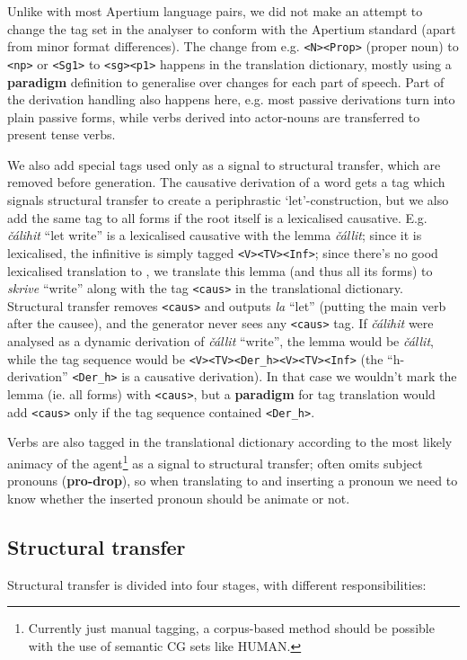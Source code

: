 \documentclass{book}
\begin{document}
Unlike with most Apertium language pairs, we did not make an attempt
to change the tag set in the analyser to conform with the Apertium
standard (apart from minor format differences). The change from e.g.
\texttt{<N><Prop>} (proper noun) to \texttt{<np>} or \texttt{<Sg1>} to
\texttt{<sg><p1>} happens in the translation dictionary, mostly using a
\textbf{paradigm} definition to generalise over changes for each part
of speech. Part of the derivation handling also happens here, e.g. 
most passive derivations turn into plain passive forms, while verbs
derived into actor-nouns are transferred to present tense verbs.

We also add special tags used only as a signal to structural transfer,
which are removed before generation. The causative derivation of a
word gets a tag which signals structural transfer to create a
periphrastic `let'-construction, but we also add the same tag to all
forms if the root itself is a lexicalised causative. E.g.
\textit{čálihit} ``let write'' is a lexicalised causative with the
lemma \textit{čállit}; since it is lexicalised, the infinitive is
simply tagged \texttt{<V><TV><Inf>}; since there's no good lexicalised
translation to \nob{}, we translate this lemma (and thus all its
forms) to \textit{skrive} ``write'' along with the tag \texttt{<caus>}
in the translational dictionary. Structural transfer removes
\texttt{<caus>} and outputs \textit{la} ``let'' (putting the main verb
after the causee), and the \nob{} generator never sees any
\texttt{<caus>} tag. If \textit{čálihit} were analysed as a dynamic
derivation of \textit{čállit} ``write'', the lemma would be
\textit{čállit}, while the tag sequence would be
\texttt{<V><TV><Der\_h><V><TV><Inf>} (the ``h-derivation''
\texttt{<Der\_h>} is a causative derivation). In that case we wouldn't
mark the lemma (ie. all forms) with \texttt{<caus>}, but a
\textbf{paradigm} for tag translation would add \texttt{<caus>} only
if the tag sequence contained \texttt{<Der\_h>}.

Verbs are also tagged in the translational dictionary according to the
most likely animacy of the agent\footnote{Currently just manual
  tagging, a corpus-based method should be possible with the use of
  semantic CG sets like HUMAN.} as a signal to structural transfer;
\sme{} often omits subject pronouns (\textbf{pro-drop}), so when
translating to \nob{} and inserting a pronoun we need to know whether
the inserted pronoun should be animate or not.

\subsection{Structural transfer}
\label{sec:structural-transfer}
Structural transfer is divided into four stages, with different
responsibilities:
\end{document}
